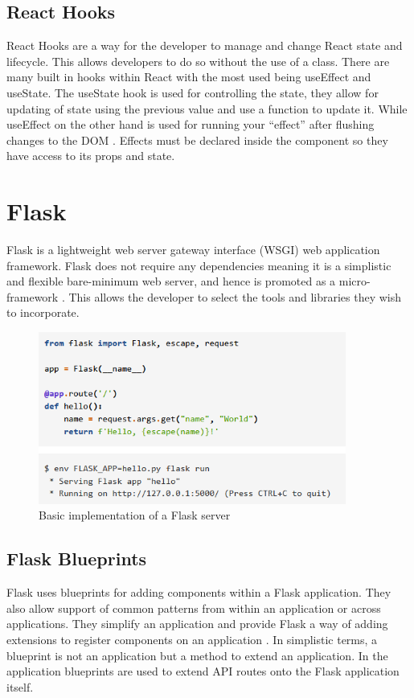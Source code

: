 \subsection{React Hooks}
React Hooks are a way for the developer to manage and change React state and lifecycle. This allows developers to do so without the use of a class. There are many built in hooks within React with the most used being useEffect and useState. The useState hook is used for controlling the state, they allow for updating of state using the previous value and use a function to update it. While useEffect on the other hand is used for running your “effect” after flushing changes to the DOM \cite{tran2020tooling}. Effects must be declared inside the component so they have access to its props and state.

\section{Flask}
Flask is a lightweight web server gateway interface (WSGI) web application framework. Flask does not require any dependencies meaning it is a simplistic and flexible bare-minimum web server, and hence is promoted as a micro-framework \cite{vogel2017low}. This allows the developer to select the tools and libraries they wish to incorporate.
\begin{figure}[h!]
 	\caption{Basic implementation of a Flask server}
	\label{image:flask}
 	\centering
 	\includegraphics[width=0.9\textwidth]{Images/flask.PNG}
\end{figure}
\newpage

\subsection{Flask Blueprints}
Flask uses blueprints for adding components within a Flask application. They also allow support of common patterns from within an application or across applications. They simplify an application and provide Flask a way of adding extensions to register components on an application \cite{stouffer2015mastering}. In simplistic terms, a blueprint is not an application but a method to extend an application. In the application blueprints are used to extend API routes onto the Flask application itself.

